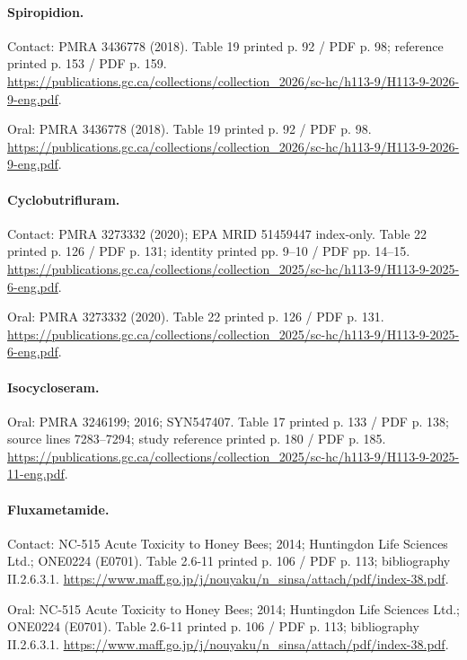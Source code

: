 \paragraph{Spiropidion.}

Contact: PMRA 3436778 (2018). Table 19 printed p. 92 / PDF p. 98; reference printed p. 153 / PDF p. 159. \url{https://publications.gc.ca/collections/collection_2026/sc-hc/h113-9/H113-9-2026-9-eng.pdf}.

Oral: PMRA 3436778 (2018). Table 19 printed p. 92 / PDF p. 98. \url{https://publications.gc.ca/collections/collection_2026/sc-hc/h113-9/H113-9-2026-9-eng.pdf}.

\paragraph{Cyclobutrifluram.}

Contact: PMRA 3273332 (2020); EPA MRID 51459447 index-only. Table 22 printed p. 126 / PDF p. 131; identity printed pp. 9--10 / PDF pp. 14--15. \url{https://publications.gc.ca/collections/collection_2025/sc-hc/h113-9/H113-9-2025-6-eng.pdf}.

Oral: PMRA 3273332 (2020). Table 22 printed p. 126 / PDF p. 131. \url{https://publications.gc.ca/collections/collection_2025/sc-hc/h113-9/H113-9-2025-6-eng.pdf}.

\paragraph{Isocycloseram.}

Oral: PMRA 3246199; 2016; SYN547407. Table 17 printed p. 133 / PDF p. 138; source lines 7283--7294; study reference printed p. 180 / PDF p. 185. \url{https://publications.gc.ca/collections/collection_2025/sc-hc/h113-9/H113-9-2025-11-eng.pdf}.

\paragraph{Fluxametamide.}

Contact: NC-515 Acute Toxicity to Honey Bees; 2014; Huntingdon Life Sciences Ltd.; ONE0224 (E0701). Table 2.6-11 printed p. 106 / PDF p. 113; bibliography II.2.6.3.1. \url{https://www.maff.go.jp/j/nouyaku/n_sinsa/attach/pdf/index-38.pdf}.

Oral: NC-515 Acute Toxicity to Honey Bees; 2014; Huntingdon Life Sciences Ltd.; ONE0224 (E0701). Table 2.6-11 printed p. 106 / PDF p. 113; bibliography II.2.6.3.1. \url{https://www.maff.go.jp/j/nouyaku/n_sinsa/attach/pdf/index-38.pdf}.

